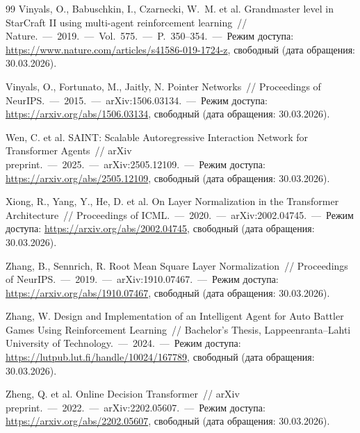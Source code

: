 \documentclass[a4paper,12pt]{extarticle}
\begin{document}
\begin{thebibliography}{99}
  Vinyals, O., Babuschkin, I., Czarnecki, W.~M. et al. Grandmaster level in StarCraft II using multi-agent reinforcement learning~// Nature.~---~2019.~---~Vol.~575.~---~P.~350--354.~---~Режим доступа: \url{https://www.nature.com/articles/s41586-019-1724-z}, свободный (дата обращения: 30.03.2026).

  Vinyals, O., Fortunato, M., Jaitly, N. Pointer Networks~// Proceedings of NeurIPS.~---~2015.~---~arXiv:1506.03134.~---~Режим доступа: \url{https://arxiv.org/abs/1506.03134}, свободный (дата обращения: 30.03.2026).

  Wen, C. et al. SAINT: Scalable Autoregressive Interaction Network for Transformer Agents~// arXiv preprint.~---~2025.~---~arXiv:2505.12109.~---~Режим доступа: \url{https://arxiv.org/abs/2505.12109}, свободный (дата обращения: 30.03.2026).

  Xiong, R., Yang, Y., He, D. et al. On Layer Normalization in the Transformer Architecture~// Proceedings of ICML.~---~2020.~---~arXiv:2002.04745.~---~Режим доступа: \url{https://arxiv.org/abs/2002.04745}, свободный (дата обращения: 30.03.2026).

  Zhang, B., Sennrich, R. Root Mean Square Layer Normalization~// Proceedings of NeurIPS.~---~2019.~---~arXiv:1910.07467.~---~Режим доступа: \url{https://arxiv.org/abs/1910.07467}, свободный (дата обращения: 30.03.2026).

  Zhang, W. Design and Implementation of an Intelligent Agent for Auto Battler Games Using Reinforcement Learning~// Bachelor's Thesis, Lappeenranta--Lahti University of Technology.~---~2024.~---~Режим доступа: \url{https://lutpub.lut.fi/handle/10024/167789}, свободный (дата обращения: 30.03.2026).

  Zheng, Q. et al. Online Decision Transformer~// arXiv preprint.~---~2022.~---~arXiv:2202.05607.~---~Режим доступа: \url{https://arxiv.org/abs/2202.05607}, свободный (дата обращения: 30.03.2026).

\end{thebibliography}
\end{document}
